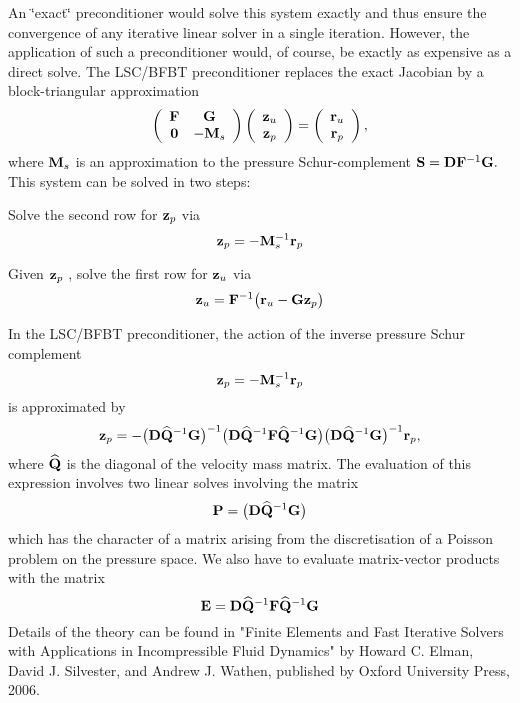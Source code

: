 An \char`\"{}exact\char`\"{} preconditioner would solve this system exactly and thus ensure the convergence of any iterative linear solver in a single iteration. However, the application of such a preconditioner would, of course, be exactly as expensive as a direct solve. The L\+S\+C/\+B\+F\+BT preconditioner replaces the exact Jacobian by a block-\/triangular approximation \[ \left( \begin{array}{cc} {\bf F} & {\bf G} \\ {\bf 0} & -{\bf M}_s \end{array} \right) \left( \begin{array}{c} {\bf z}_u \\ {\bf z}_p \end{array} \right) = \left( \begin{array}{c} {\bf r}_u \\ {\bf r}_p \end{array} \right), \] where ${\bf M}_s$ is an approximation to the pressure Schur-\/complement $ {\bf S} = {\bf D} {\bf F}^{-1}{\bf G}. $ This system can be solved in two steps\+:
\begin{DoxyEnumerate}
\item Solve the second row for $ {\bf z}_p$ via \[ {\bf z}_p = - {\bf M}_s^{-1} {\bf r}_p \]
\item Given $ {\bf z}_p $ , solve the first row for $ {\bf z}_u$ via \[ {\bf z}_u = {\bf F}^{-1} \big( {\bf r}_u - {\bf G} {\bf z}_p \big) \]
\end{DoxyEnumerate}In the L\+S\+C/\+B\+F\+BT preconditioner, the action of the inverse pressure Schur complement \[ {\bf z}_p = - {\bf M}_s^{-1} {\bf r}_p \] is approximated by \[ {\bf z}_p = - \big({\bf D} \widehat{\bf Q}^{-1}{\bf G} \big)^{-1} \big({\bf D} \widehat{\bf Q}^{-1}{\bf F} \widehat{\bf Q}^{-1}{\bf G}\big) \big({\bf D} \widehat{\bf Q}^{-1}{\bf G} \big)^{-1} {\bf r}_p, \] where $ \widehat{\bf Q} $ is the diagonal of the velocity mass matrix. The evaluation of this expression involves two linear solves involving the matrix \[ {\bf P} = \big({\bf D} \widehat{\bf Q}^{-1}{\bf G} \big) \] which has the character of a matrix arising from the discretisation of a Poisson problem on the pressure space. We also have to evaluate matrix-\/vector products with the matrix \[ {\bf E}={\bf D}\widehat{\bf Q}^{-1}{\bf F}\widehat{\bf Q}^{-1}{\bf G} \] Details of the theory can be found in "Finite Elements and Fast Iterative Solvers with Applications in Incompressible Fluid Dynamics" by Howard C. Elman, David J. Silvester, and Andrew J. Wathen, published by Oxford University Press, 2006. ~\newline

